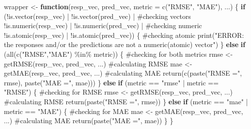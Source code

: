 \documentclass[
  letterpaper,
  DIV=11,
  numbers=noendperiod]{scrartcl}
\newenvironment{Shaded}{\begin{snugshade}}{\end{snugshade}}
\newcommand{\AttributeTok}[1]{\textcolor[rgb]{0.40,0.45,0.13}{#1}}
\newcommand{\CommentTok}[1]{\textcolor[rgb]{0.37,0.37,0.37}{#1}}
\newcommand{\ControlFlowTok}[1]{\textcolor[rgb]{0.00,0.23,0.31}{\textbf{#1}}}
\newcommand{\FunctionTok}[1]{\textcolor[rgb]{0.28,0.35,0.67}{#1}}
\newcommand{\NormalTok}[1]{\textcolor[rgb]{0.00,0.23,0.31}{#1}}
\newcommand{\OtherTok}[1]{\textcolor[rgb]{0.00,0.23,0.31}{#1}}
\newcommand{\SpecialCharTok}[1]{\textcolor[rgb]{0.37,0.37,0.37}{#1}}
\newcommand{\StringTok}[1]{\textcolor[rgb]{0.13,0.47,0.30}{#1}}
\begin{document}
\begin{Shaded}
\begin{Highlighting}[]
\NormalTok{wrapper }\OtherTok{\textless{}{-}} \ControlFlowTok{function}\NormalTok{(resp\_vec, pred\_vec, }\AttributeTok{metric =} \FunctionTok{c}\NormalTok{(}\StringTok{"RMSE"}\NormalTok{, }\StringTok{"MAE"}\NormalTok{), ...) \{}
  \ControlFlowTok{if}\NormalTok{ (}\SpecialCharTok{!}\FunctionTok{is.vector}\NormalTok{(resp\_vec) }\SpecialCharTok{|} \SpecialCharTok{!}\FunctionTok{is.vector}\NormalTok{(pred\_vec) }\SpecialCharTok{|} \CommentTok{\#checking vectors}
      \SpecialCharTok{!}\FunctionTok{is.numeric}\NormalTok{(resp\_vec) }\SpecialCharTok{|} \SpecialCharTok{!}\FunctionTok{is.numeric}\NormalTok{(pred\_vec) }\SpecialCharTok{|} \CommentTok{\#checking numeric}
      \SpecialCharTok{!}\FunctionTok{is.atomic}\NormalTok{(resp\_vec) }\SpecialCharTok{|} \SpecialCharTok{!}\FunctionTok{is.atomic}\NormalTok{(pred\_vec)) \{ }\CommentTok{\#checking atomic}
    \FunctionTok{print}\NormalTok{(}\StringTok{"ERROR: the responses and/or the predictions are not a numeric(atomic) vector"}\NormalTok{)}
\NormalTok{    \} }\ControlFlowTok{else} \ControlFlowTok{if}\NormalTok{ (}\FunctionTok{all}\NormalTok{(}\FunctionTok{c}\NormalTok{(}\StringTok{"RMSE"}\NormalTok{,}\StringTok{"MAE"}\NormalTok{) }\SpecialCharTok{\%in\%}\NormalTok{ metric)) \{ }\CommentTok{\#checking for both metrics}
\NormalTok{      rmse }\OtherTok{\textless{}{-}} \FunctionTok{getRMSE}\NormalTok{(resp\_vec, pred\_vec, ...) }\CommentTok{\#calculating RMSE}
\NormalTok{      mae }\OtherTok{\textless{}{-}} \FunctionTok{getMAE}\NormalTok{(resp\_vec, pred\_vec, ...) }\CommentTok{\#calculating MAE}
      \FunctionTok{return}\NormalTok{(}\FunctionTok{c}\NormalTok{(}\FunctionTok{paste}\NormalTok{(}\StringTok{"RMSE ="}\NormalTok{, rmse), }\FunctionTok{paste}\NormalTok{(}\StringTok{"MAE ="}\NormalTok{, mae)))}
\NormalTok{      \} }\ControlFlowTok{else} \ControlFlowTok{if}\NormalTok{ (metric }\SpecialCharTok{==} \StringTok{"rmse"} \SpecialCharTok{|}\NormalTok{ metric }\SpecialCharTok{==} \StringTok{"RMSE"}\NormalTok{) \{ }\CommentTok{\#checking for RMSE}
\NormalTok{        rmse }\OtherTok{\textless{}{-}} \FunctionTok{getRMSE}\NormalTok{(resp\_vec, pred\_vec, ...) }\CommentTok{\#calculating RMSE}
        \FunctionTok{return}\NormalTok{(}\FunctionTok{paste}\NormalTok{(}\StringTok{"RMSE ="}\NormalTok{, rmse))}
\NormalTok{        \} }\ControlFlowTok{else} \ControlFlowTok{if}\NormalTok{ (metric }\SpecialCharTok{==} \StringTok{"mae"} \SpecialCharTok{|}\NormalTok{ metric }\SpecialCharTok{==} \StringTok{"MAE"}\NormalTok{) \{ }\CommentTok{\#checking for MAE}
\NormalTok{          mae }\OtherTok{\textless{}{-}} \FunctionTok{getMAE}\NormalTok{(resp\_vec, pred\_vec, ...) }\CommentTok{\#calculating MAE}
          \FunctionTok{return}\NormalTok{(}\FunctionTok{paste}\NormalTok{(}\StringTok{"MAE ="}\NormalTok{, mae))}
\NormalTok{        \}}
\NormalTok{  \}}
\end{Highlighting}
\end{Shaded}
\end{document}
